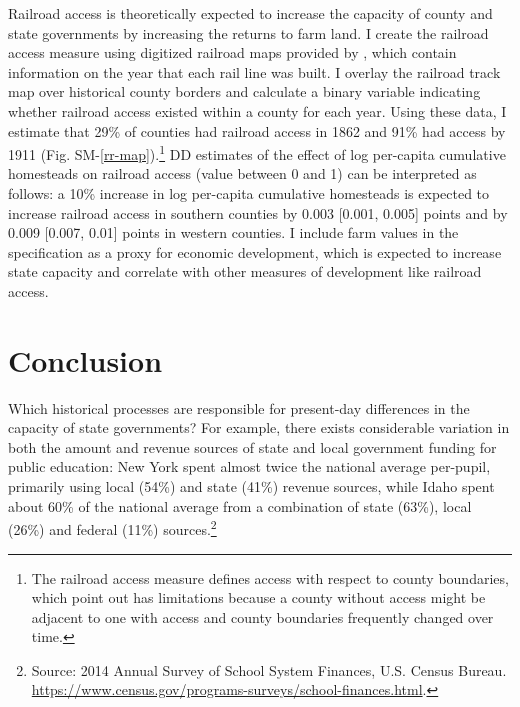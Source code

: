 \documentclass[12pt]{article}
\begin{document}
Railroad access is theoretically expected to increase the capacity of county and state governments by increasing the returns to farm land. I create the railroad access measure using digitized railroad maps provided by \citet{atack2013use}, which contain information on the year that each rail line was built. I overlay the railroad track map over historical county borders and calculate a binary variable indicating whether railroad access existed within a county for each year. Using these data, I estimate that 29\% of counties had railroad access in 1862 and 91\% had access by 1911 (Fig. SM-\ref{rr-map}).\footnote{The railroad access measure defines access with respect to county boundaries, which \citet{atack2012impact} point out has limitations because a county without access might be adjacent to one with access and county boundaries frequently changed over time.} DD estimates of the effect of log per-capita cumulative homesteads on railroad access (value between 0 and 1) can be interpreted as follows: a 10\% increase in log per-capita cumulative homesteads is expected to increase railroad access in southern counties by 0.003 [0.001, 0.005] points and by 0.009 [0.007, 0.01] points in western counties. I include farm values in the specification as a proxy for economic development, which is expected to increase state capacity and correlate with other measures of development like railroad access. 

\section{Conclusion} \label{discussion} 

Which historical processes are responsible for present-day differences in the capacity of state governments? For example, there exists considerable variation in both the amount and revenue sources of state and local government funding for public education: New York spent almost twice the national average per-pupil, primarily using local (54\%) and state (41\%) revenue sources, while Idaho spent about 60\% of the national average from a combination of state (63\%), local (26\%) and federal (11\%) sources.\footnote{Source: 2014 Annual Survey of School System Finances, U.S. Census Bureau. \url{https://www.census.gov/programs-surveys/school-finances.html}.}
\end{document}
